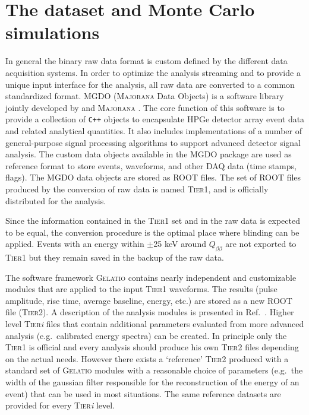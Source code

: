 \chapter{The {\gerda} dataset and Monte Carlo simulations}
 In general the binary raw data format is custom defined by the different data acquisition systems. In order to optimize the analysis streaming and to provide a unique input interface for the analysis, all raw data are converted to a common standardized format. MGDO \cite{MGDO} (\textsc{Majorana} {\gerda} Data Objects) is a software library jointly developed by {\gerda} and \textsc{Majorana} \cite{majoranadem}. The core function of this software is to provide a collection of \texttt{C++} objects to encapsulate HPGe detector array event data and related analytical quantities. It also includes implementations of a number of general-purpose signal processing algorithms to support advanced detector signal analysis. The custom data objects available in the MGDO package are used as reference format to store events, waveforms, and other DAQ data (time stamps, flags). The MGDO data objects are stored as ROOT \cite{ROOT} files. The set of ROOT files produced by the conversion of raw data is named \textsc{Tier1}, and is officially distributed for the analysis.

Since the information contained in the \textsc{Tier1} set and in the raw data is expected to be equal, the conversion procedure is the optimal place where blinding can be applied. Events with an energy within $\pm$25 keV around $Q_{\beta\beta}$ are not exported to \textsc{Tier1} but they remain saved in the backup of the raw data.

The software framework \textsc{Gelatio} \cite{GELATIO} contains nearly independent and customizable modules that are applied to the input \textsc{Tier1} waveforms. The results (pulse amplitude, rise time, average baseline, energy, etc.) are stored as a new ROOT file (\textsc{Tier2}). A description of the analysis modules is presented in Ref.~\cite{dataproc}. Higher level \textsc{Tier}\emph{i} files that contain additional parameters evaluated from more advanced analysis (e.g.~calibrated energy spectra) can be created. In principle only the \textsc{Tier1} is official and every analysis should produce his own \textsc{Tier2} files depending on the actual needs. However there exists a `reference' \textsc{Tier2} produced with a standard set of \textsc{Gelatio} modules with a reasonable choice of parameters (e.g.~the width of the gaussian filter responsible for the reconstruction of the energy of an event) that can be used in most situations. The same reference datasets are provided for every \textsc{Tier}\emph{i} level.

